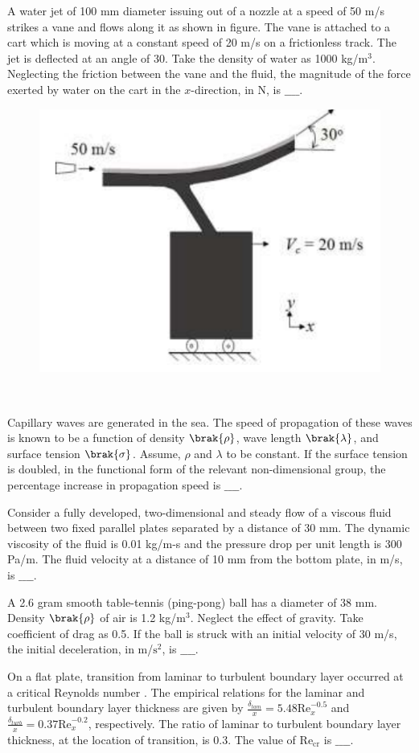\item A water jet of 100 mm diameter issuing out of a nozzle at a speed of 50 m/s strikes a vane and flows along it as shown in figure. The vane is attached to a cart which is moving at a constant speed of 20 m/s on a frictionless track. The jet is deflected at an angle of 30\degree. Take the density of water as 1000 kg/$\text{m}^3$. Neglecting the friction between the vane and the fluid, the magnitude of the force exerted by water on the cart in the $x$-direction, in N, is $\_\_\_\_$. 
\begin{figure}[!ht]
\centering
\includegraphics[width=0.5\linewidth]{figs/2018-XE/Q9.png}
\end{figure}\\
\item Capillary waves are generated in the sea. The speed of propagation  of these waves is known to be a function of density $\brak{\rho}$, wave length $\brak{\lambda}$, and surface tension $\brak{\sigma}$. Assume, $\rho$ and $\lambda$ to be constant. If the surface tension is doubled, in the functional form of the relevant non-dimensional group, the percentage increase in propagation speed  is $\_\_\_\_$. \\
\item Consider a fully developed, two-dimensional and steady flow of a viscous fluid between two fixed parallel plates separated by a distance of 30 mm. The dynamic viscosity of the fluid is 0.01 kg/m-s and the pressure drop per unit length is 300 Pa/m. The fluid velocity at a distance of 10 mm from the bottom plate, in m/s, is $\_\_\_\_$. \\
\item A 2.6 gram smooth table-tennis (ping-pong) ball has a diameter of 38 mm. Density $\brak{\rho}$ of air is 1.2 kg/$\text{m}^3$. Neglect the effect of gravity. Take coefficient of drag as 0.5. If the ball is struck with an initial velocity of 30 m/s, the initial deceleration, in m/$\text{s}^2$, is $\_\_\_\_$. \\
\item On a flat plate, transition from laminar to turbulent boundary layer occurred at a critical Reynolds number . The empirical relations for the laminar and turbulent boundary layer thickness are given by $\frac{\delta_{lam}}{x} = 5.48 \text{Re}_{x}^{-0.5}$ and $\frac{\delta_{turb}}{x} = 0.37 \text{Re}_{x}^{-0.2}$, respectively. The ratio of laminar to turbulent boundary layer thickness, at the location of transition, is 0.3.
The value of $\text{Re}_{\text{cr}}$ is $\_\_\_\_$. \\
